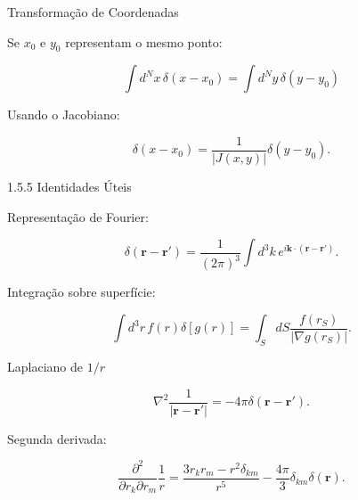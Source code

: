\documentclass[aspectratio=169]{beamer}
\begin{document}
\begin{frame}{Transformação de Coordenadas}

Se $x_0$ e $y_0$ representam o mesmo ponto:

\begin{equation}
\int d^N x\, \delta(x-x_0)
=
\int d^N y\, \delta(y-y_0)
\tag{1.117}
\end{equation}

Usando o Jacobiano:

\begin{equation}
\delta(x-x_0)
=
\frac{1}{|J(x,y)|}
\delta(y-y_0).
\tag{1.118}
\end{equation}

\end{frame}

\begin{frame}{1.5.5 Identidades Úteis}

Representação de Fourier:

\begin{equation}
\delta(\mathbf r-\mathbf r')
=
\frac{1}{(2\pi)^3}
\int d^3k\, e^{i\mathbf k\cdot(\mathbf r-\mathbf r')}.
\tag{1.119}
\end{equation}

Integração sobre superfície:

\begin{equation}
\int d^3r\, f(r)\delta[g(r)]
=
\int_S dS \frac{f(r_S)}{|\nabla g(r_S)|}.
\tag{1.120}
\end{equation}

\end{frame}

\begin{frame}{Laplaciano de $1/r$}

\begin{equation}
\nabla^2 \frac{1}{|\mathbf r-\mathbf r'|}
=
-4\pi \delta(\mathbf r-\mathbf r').
\tag{1.121}
\end{equation}

Segunda derivada:

\begin{equation}
\frac{\partial^2}{\partial r_k \partial r_m}
\frac{1}{r}
=
\frac{3r_k r_m - r^2\delta_{km}}{r^5}
-
\frac{4\pi}{3}\delta_{km}\delta(\mathbf r).
\tag{1.122}
\end{equation}

\end{frame}
\end{document}
